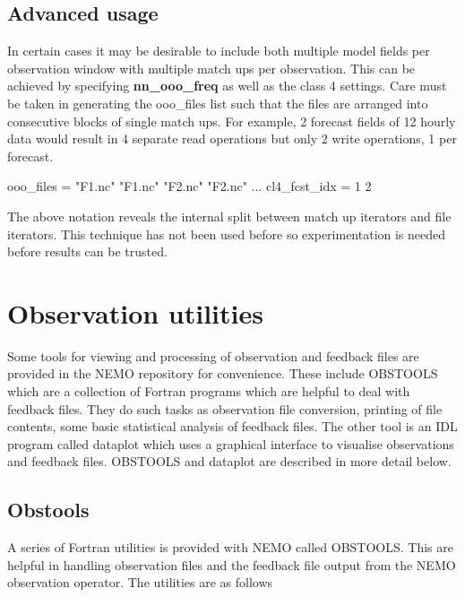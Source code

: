 \documentclass[../tex_main/NEMO_manual]{subfiles}
\begin{document}
\subsection{Advanced usage}

In certain cases it may be desirable to include both multiple model fields per observation window with
multiple match ups per observation.
This can be achieved by specifying \textbf{nn\_ooo\_freq} as well as the class 4 settings.
Care must be taken in generating the ooo\_files list such that the files are arranged into
consecutive blocks of single match ups.
For example, 2 forecast fields of 12 hourly data would result in 4 separate read operations but
only 2 write operations, 1 per forecast.

\begin{forlines}
   ooo_files = "F1.nc" "F1.nc" "F2.nc" "F2.nc"
...
   cl4_fcst_idx = 1 2
\end{forlines}

The above notation reveals the internal split between match up iterators and file iterators.
This technique has not been used before so experimentation is needed before results can be trusted.




\newpage

\section{Observation utilities}
\label{sec:OBS_obsutils}

Some tools for viewing and processing of observation and feedback files are provided in
the NEMO repository for convenience.
These include OBSTOOLS which are a collection of Fortran programs which are helpful to deal with feedback files.
They do such tasks as observation file conversion, printing of file contents,
some basic statistical analysis of feedback files.
The other tool is an IDL program called dataplot which uses a graphical interface to
visualise observations and feedback files.
OBSTOOLS and dataplot are described in more detail below.

\subsection{Obstools}

A series of Fortran utilities is provided with NEMO called OBSTOOLS.
This are helpful in handling observation files and the feedback file output from the NEMO observation operator.
The utilities are as follows
\end{document}

